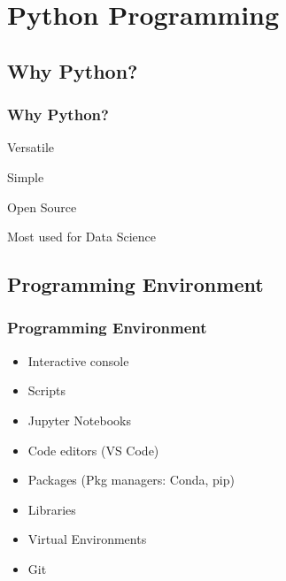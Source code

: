 



\begin{frame}
   \titlepage
\end{frame}



\begin{frame}
   \tableofcontents
\end{frame}

\section{Python Programming}


\subsection{Why Python?}
\begin{frame}\frametitle{Why Python?}
   \item Versatile
   \item Simple
   \item Open Source
   \item Most used for Data Science
\end{frame}


\subsection{Programming Environment}
\begin{frame}\frametitle{Programming Environment}

      \begin{itemize}
         \item<1-> Interactive console
         \item<2-> Scripts
         \item<3-> Jupyter Notebooks
         \item<4-> Code editors (VS Code)
         \item<5-> Packages (Pkg managers: Conda, pip)
         \item<6-> Libraries
         \item<7-> Virtual Environments
         \item<8-> Git
      \end{itemize}

\end{frame}
